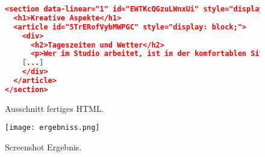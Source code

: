 \begin{figure}[htb]
\begin{minipage}[b]{1.0\linewidth}
\begin{lstlisting}[language=json]
<section data-linear="1" id="EWTKcQGzuLWnxUi" style="display: block;">
  <h1>Kreative Aspekte</h1>
  <article id="5TrERofVybMWPGC" style="display: block;">
    <div>
      <h2>Tageszeiten und Wetter</h2>
      <p>Wer im Studio arbeitet, ist in der komfortablen Situation, sich nicht nach der Lichtsituation richten zu m\"ussen. Wer aber Natur-, Sport- oder Eventfotografie betreiben will, kommt um Basiswissen \"uber die Sonne und ihre Auswirkungen nicht herum.</p>
    [...]
    </div>
  </article>
</section>
\end{lstlisting}

\end{minipage}
\caption{Ausschnitt fertiges HTML.}
\label{fig:res}
\end{figure}


\begin{figure}[htb]
\begin{minipage}[b]{1.0\linewidth}
  \centering
\centerline{\texttt{[image: ergebniss.png]}}
\end{minipage}
\caption{Screenshot Ergebnis.}
\label{fig:res}
\end{figure}

